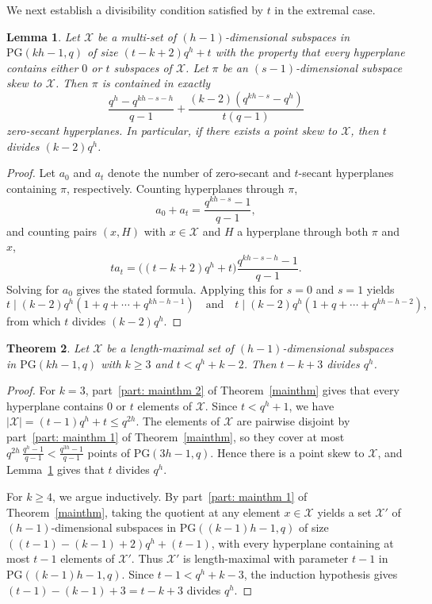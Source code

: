 \documentclass[12pt, twoside]{article}
\newtheorem{theorem}{\bf Theorem}%
\newtheorem{lemma}[theorem]{\bf Lemma}
\begin{document}
	We next establish a divisibility condition satisfied by $t$ in the extremal case. 
		
	\begin{lemma} \label{dividinglemma}
		Let $\mathcal{X}$ be a multi-set of $(h-1)$-dimensional subspaces in $\mathrm{PG}(kh-1,q)$ of size $(t-k+2)q^h+t$ with the property that every hyperplane contains either $0$ or $t$ subspaces of $\mathcal{X}$. Let $\pi$ be an $(s-1)$-dimensional subspace skew to $\mathcal{X}$. Then $\pi$ is contained in exactly
		$$
		\frac{q^h-q^{kh-s-h}}{q-1}+\frac{(k-2)(q^{kh-s}-q^h)}{t(q-1)}
		$$
		zero-secant hyperplanes. In particular, if there exists a point skew to $\mathcal{X}$, then $t$ divides $(k-2)q^h$.
	\end{lemma}
	
	\begin{proof}
		Let $a_0$ and $a_t$ denote the number of zero-secant and $t$-secant hyperplanes containing $\pi$, respectively. Counting hyperplanes through $\pi$,
		$$
		a_0+a_t=\frac{q^{kh-s}-1}{q-1},
		$$
		and counting pairs $(x,H)$ with $x \in \mathcal{X}$ and $H$ a hyperplane through both $\pi$ and $x$,
		$$
		ta_t=\bigl((t-k+2)q^h+t\bigr)\frac{q^{kh-s-h}-1}{q-1}.
		$$
		Solving for $a_0$ gives the stated formula. Applying this for $s=0$ and $s=1$ yields
		$$
		t \mid (k-2)q^h(1+q+\cdots+q^{kh-h-1}) \quad \text{and} \quad t \mid (k-2)q^h(1+q+\cdots+q^{kh-h-2}),
		$$
		from which $t$ divides $(k-2)q^h$.
	\end{proof}
	
	
	
	\begin{theorem} \label{cor: divisibility}
		Let $\mathcal{X}$ be a length-maximal set of $(h-1)$-dimensional subspaces in $\mathrm{PG}(kh-1, q)$ with $k\ge 3$ and $t < q^h+k-2$. Then $t-k+3$ divides $q^h$.
	\end{theorem}
	
	\begin{proof}
		For $k=3$, part~\ref{part: mainthm 2} of Theorem~\ref{mainthm} gives that every hyperplane contains $0$ or $t$ elements of $\mathcal{X}$.   Since $t<q^h+1$, we have $|\mathcal{X}|=(t-1)q^h+t \le q^{2h}$. The elements of $\mathcal{X}$ are pairwise disjoint by part~\ref{part: mainthm 1} of Theorem~\ref{mainthm}, so they cover at most $
		q^{2h}\,\frac{q^h-1}{q-1} < \frac{q^{3h}-1}{q-1}
		$
		points of $\mathrm{PG}(3h-1,q)$. Hence there is a point skew to $\mathcal{X}$, and Lemma~\ref{dividinglemma} gives that $t$ divides $q^h$.
		
		For $k \ge 4$, we argue inductively. By part~\ref{part: mainthm 1} of Theorem~\ref{mainthm}, taking the quotient at any element $x \in \mathcal{X}$ yields a set $\mathcal{X}'$ of $(h-1)$-dimensional subspaces in $\mathrm{PG}((k-1)h-1,q)$ of size $ ((t-1)-(k-1)+2)q^h+(t-1)$, with every hyperplane containing at most $t-1$ elements of $\mathcal{X}'$. Thus $\mathcal{X}'$ is length-maximal with parameter $t-1$ in $\mathrm{PG}((k-1)h-1,q)$. Since $t-1 < q^h+k-3$, the induction hypothesis gives $(t-1)-(k-1)+3 = t-k+3$ divides $q^h$.
	\end{proof}
	
\end{document}
